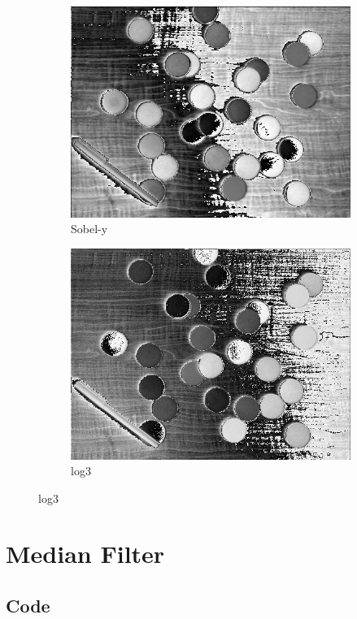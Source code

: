 \documentclass[14pt]{article}
\begin{document}
\begin{figure}[hbt!]
		\begin{subfigure}[b]{0.23\linewidth}
			\includegraphics[width=\linewidth]{k7.png}
			\caption{Sobel-y}
		\end{subfigure}
		\begin{subfigure}[b]{0.23\linewidth}
			\includegraphics[width=\linewidth]{k8.png}
			\caption{log3}
		\end{subfigure}
	\end{figure}
	\section{Median Filter}
	\subsection{Code}
	
\end{document}
